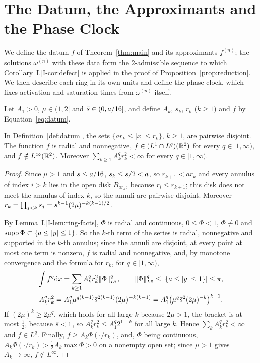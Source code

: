 \section{The Datum, the Approximants and the Phase Clock}
\label{sec:datum}

We define the datum $f$ of Theorem~\ref{thm:main} and its approximants
$f^{(n)}$; the solutions $\omega^{(n)}$ with these data form the
$2$-admissible sequence to which Corollary~I.\ref{I-cor:defect} is applied in
the proof of Proposition~\ref{prop:reduction}. We then describe each ring in
its own units and define the phase clock, which fixes activation and
saturation times from $\omega^{(n)}$ itself.

\begin{definition}
\label{def:datum}
Let $A_1>0$, $\mu\in(1,2]$ and $\bar s\in(0,a/16]$, and define $A_k$, $s_k$,
$r_k$ ($k\ge1$) and $f$ by Equation~\eqref{eq:datum}.
\end{definition}

\begin{proposition}
\label{prop:integrability}
In Definition~\ref{def:datum}, the sets $\{ar_k\le|x|\le r_k\}$, $k\ge1$, are
pairwise disjoint.
The function $f$ is radial and nonnegative, $f\in (L^1\cap L^q)(\mathbb{R}^2)$ for every
$q\in[1,\infty)$, and $f\notin L^\infty(\mathbb{R}^2)$. Moreover
$\sum_{k\ge1}A_k^qr_k^2<\infty$ for every $q\in[1,\infty)$.
\end{proposition}
\begin{proof}
Since $\mu>1$ and $\bar s\le a/16$, $s_k\le\bar s/2<a$, so $r_{k+1}<ar_k$ and every
annulus of index $i>k$ lies in the open disk $B_{ar_k}$, because $r_i\le r_{k+1}$;
this disk does not meet the annulus of index $k$, so the annuli are pairwise
disjoint. Moreover
$r_k=\prod_{j<k}s_j=\bar s^{k-1}(2\mu)^{-k(k-1)/2}$.

By Lemma~I.\ref{I-lem:ring-facts}, $\Phi$ is radial and continuous, $0\le\Phi<1$,
$\Phi\not\equiv0$ and $\operatorname{supp}\Phi\subset\{a\le|y|\le1\}$. So the $k$-th term of
the series is radial, nonnegative and supported in the $k$-th annulus; since the
annuli are disjoint, at every point at most one term is nonzero, $f$ is radial and nonnegative, and, by
monotone convergence and the formula for $r_k$, for $q\in[1,\infty)$,
\begin{gather*}
\int f^q\dd x=\sum_{k\ge1}A_k^qr_k^2\|\Phi\|_{L^q}^q,\qquad
\|\Phi\|_{L^q}^q\le|\{a\le|y|\le1\}|\le\pi,\\
A_k^qr_k^2=A_1^q\mu^{q(k-1)}\bar s^{2(k-1)}(2\mu)^{-k(k-1)}=A_1^q\big(\mu^q\bar s^2(2\mu)^{-k}\big)^{k-1}.
\end{gather*}
If $(2\mu)^k\ge2\mu^q$, which holds for all large $k$ because $2\mu>1$, the
bracket is at most $\frac12$, because $\bar s<1$, so
$A_k^qr_k^2\le A_1^q2^{1-k}$ for all large $k$. Hence $\sum_kA_k^qr_k^2<\infty$
and $f\in L^q$. Finally, $f\ge A_k\Phi(\cdot/r_k)$, and, $\Phi$ being continuous,
$A_k\Phi(\cdot/r_k)>\frac12A_k\max\Phi>0$ on a nonempty open set; since $\mu>1$
gives $A_k\to\infty$, $f\notin L^\infty$.
\end{proof}

